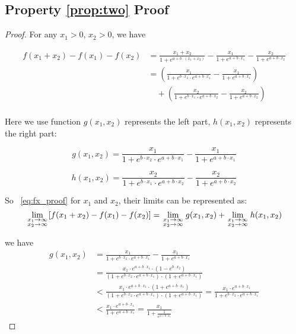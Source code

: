 \subsection{Property \ref{prop:two} Proof}
\begin{proof}
For any $x_1>0$, $x_2>0$, we have

\begin{equation}
\label{eq:fx_proof}
\begin{aligned}
f(x_1+x_2)-f(x_1)-f(x_2)&=\frac{x_1+x_2}{1+e^{a+b\cdot (x_1+x_2)}}-\frac{x_1}{1+e^{a+b\cdot x_1}}-\frac{x_2}{1+e^{a+b\cdot x_2}}\\
&=(\frac{x_1}{1+e^{b\cdot x_2}\cdot e^{a+b\cdot {x_1}}}-\frac{x_1}{1+e^{a+b\cdot x_1}})\\
&\quad +(\frac{x_2}{1+e^{b\cdot x_1}\cdot e^{a+b\cdot {x_2}}}-\frac{x_2}{1+e^{a+b\cdot x_2}})\\
\end{aligned}
\end{equation}

Here we use function $g(x_1,x_2)$ represents the left part, $h(x_1,x_2)$ represents the right part:

\begin{equation}
\label{eq:gx_func_proof}
g(x_1,x_2)=\frac{x_1}{1+e^{b\cdot x_2}\cdot e^{a+b\cdot {x_1}}}-\frac{x_1}{1+e^{a+b\cdot x_1}}
\end{equation}

\begin{equation}
\label{eq:hx_func_proof}
h(x_1,x_2)=\frac{x_2}{1+e^{b\cdot x_1}\cdot e^{a+b\cdot {x_2}}}-\frac{x_2}{1+e^{a+b\cdot x_2}}
\end{equation}

So ~\eqref{eq:fx_proof} for $x_1$ and $x_2$, their limits can be represented as:
\[
\mathop {\lim }\limits_{\scriptstyle x_1 \to \infty  \hfill \atop  \scriptstyle x_2 \to \infty  \hfill}[f(x_1+x_2)-f(x_1)-f(x_2)]=\mathop {\lim }\limits_{\scriptstyle x_1 \to \infty  \hfill \atop  \scriptstyle x_2 \to \infty  \hfill}g(x_1,x_2)+\mathop {\lim }\limits_{\scriptstyle x_1 \to \infty  \hfill \atop  \scriptstyle x_2 \to \infty  \hfill}h(x_1,x_2)
\]

we have
\[
\begin{aligned}
g(x_1,x_2)&=\frac{x_1}{1+e^{b\cdot x_2}\cdot e^{a+b\cdot {x_1}}}-\frac{x_1}{1+e^{a+b\cdot x_1}}\\
&=\frac{x_1\cdot e^{a+b\cdot x_1}\cdot(1-e^{b\cdot x_2})}{(1+e^{b\cdot x_2}\cdot e^{a+b\cdot x_1})\cdot(1+e^{a+b\cdot x_1})}\\
&<\frac{x_1\cdot e^{a+b\cdot x_1}\cdot(1+e^{a+b\cdot x_1})}{(1+e^{b\cdot x_2}\cdot e^{a+b\cdot x_1})\cdot(1+e^{a+b\cdot x_1})}=\frac{x_1\cdot e^{a+b\cdot x_1}}{1+e^{b\cdot x_2}\cdot e^{a+b\cdot x_1}}\\
&<\frac{x_1\cdot e^{a+b\cdot x_1}}{1+e^{a+b\cdot x_1}}=\frac{x_1}{1+\frac{1}{e^{a+b\cdot x_1}}}
\end{aligned}
\]


\end{proof}
